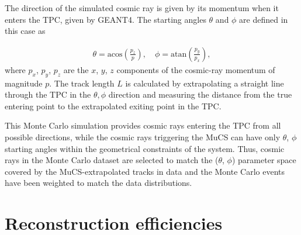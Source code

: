 \documentclass[a4paper,11pt]{article}
\begin{document}

The direction of the simulated cosmic ray is given by its momentum when it enters the TPC, given by GEANT4. The starting angles $\theta$ and $\phi$ are defined in this case as

\begin{align}\label{eq:angles_mc}
  \theta = \mathrm{acos}\left(\frac{p_{z}}{p}\right), \quad
  \phi = \mathrm{atan}\left(\frac{p_{y}}{p_{x}}\right),
\end{align}
where $p_{x}$, $p_{y}$, $p_{z}$ are the $x$, $y$, $z$ components of the cosmic-ray momentum of magnitude $p$.
The track length $L$ is calculated by extrapolating a straight line through the TPC in the $\theta, \phi$ direction and measuring the distance from the true entering point to the extrapolated exiting point in the TPC.

This Monte Carlo simulation provides cosmic rays entering the TPC from all possible directions, while the cosmic rays triggering the MuCS can have only $\theta$, $\phi$ starting angles within the geometrical constraints of the system. Thus, cosmic rays in the Monte Carlo dataset are selected to match the ($\theta$, $\phi$) parameter space covered by the MuCS-extrapolated tracks in data and the Monte Carlo events have been weighted to match the data distributions. 


\section{Reconstruction efficiencies}\label{sec:reco}
\end{document}
